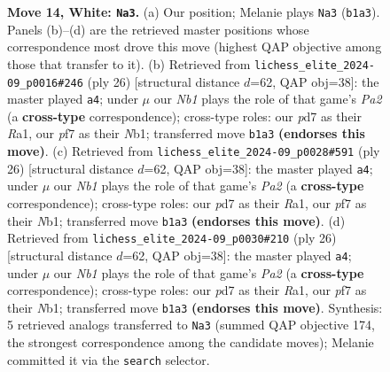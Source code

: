 \documentclass[11pt]{article}
\begin{document}
\begin{figure}[p]
\caption{\textbf{Move 14, White: \texttt{Na3}.} (a) Our position; Melanie plays \texttt{Na3} (\texttt{b1a3}). Panels (b)--(d) are the retrieved master positions whose correspondence most drove this move (highest QAP objective among those that transfer to it). (b) Retrieved from \texttt{lichess\_elite\_2024-09\_p0016\#246} (ply 26) [structural distance $d$=62, QAP obj=38]: the master played \texttt{a4}; under $\mu$ our \emph{Nb1} plays the role of that game's \emph{Pa2} (a \textbf{cross-type} correspondence); cross-type roles: our \emph{p}d7 as their \emph{R}a1, our \emph{p}f7 as their \emph{N}b1; transferred move \texttt{b1a3} \textbf{(endorses this move)}. (c) Retrieved from \texttt{lichess\_elite\_2024-09\_p0028\#591} (ply 26) [structural distance $d$=62, QAP obj=38]: the master played \texttt{a4}; under $\mu$ our \emph{Nb1} plays the role of that game's \emph{Pa2} (a \textbf{cross-type} correspondence); cross-type roles: our \emph{p}d7 as their \emph{R}a1, our \emph{p}f7 as their \emph{N}b1; transferred move \texttt{b1a3} \textbf{(endorses this move)}. (d) Retrieved from \texttt{lichess\_elite\_2024-09\_p0030\#210} (ply 26) [structural distance $d$=62, QAP obj=38]: the master played \texttt{a4}; under $\mu$ our \emph{Nb1} plays the role of that game's \emph{Pa2} (a \textbf{cross-type} correspondence); cross-type roles: our \emph{p}d7 as their \emph{R}a1, our \emph{p}f7 as their \emph{N}b1; transferred move \texttt{b1a3} \textbf{(endorses this move)}. Synthesis: 5 retrieved analogs transferred to \texttt{Na3} (summed QAP objective 174, the strongest correspondence among the candidate moves); Melanie committed it via the \texttt{search} selector.}
\label{fig:thought-m26}
\end{figure}

\clearpage
\end{document}
